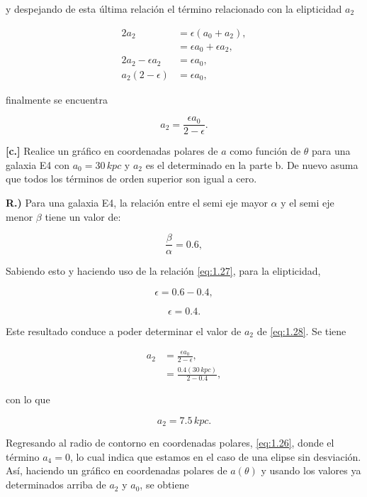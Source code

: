 \documentclass[paper=a4, fontsize=10pt]{scrartcl} %
\begin{document}
y despejando de esta última relación el término relacionado con la elipticidad $a_2$

\begin{align*}
2 a_2 & = \epsilon(a_0 + a_2), \\
& = \epsilon a_0 + \epsilon a_2, \\
2a_2 - \epsilon a_2 & =  \epsilon a_0, \\
a_2 (2 - \epsilon) & = \epsilon a_0, 
\end{align*}

finalmente se encuentra 

\begin{equation} \label{eq:1.28}
a_2 = \frac{\epsilon a_0}{2- \epsilon}.
\end{equation}


{\bf{[c.]}} Realice un gráfico en coordenadas polares de $a$ como función de $\theta$ para una galaxia E4 con $a_0 = 30 \, kpc$ y $a_2$ es el determinado en la parte b. De nuevo asuma que todos los términos de
orden superior son igual a cero. 

\vspace{0.3cm} 

{\bf{R.)}} Para una galaxia E4, la relación entre el semi eje mayor $\alpha$ y el semi eje menor $\beta$ tiene un valor de: 

$$ \frac{\beta}{\alpha} = 0.6, $$

Sabiendo esto y haciendo uso de la relación \eqref{eq:1.27}, para la elipticidad, 

$$ \epsilon = 0.6 - 0.4,$$

\begin{equation} \label{eq:1.29} 
\epsilon = 0.4. 
\end{equation}

Este resultado conduce a poder determinar el valor de $a_2$ de \eqref{eq:1.28}. Se tiene 

\begin{align*}
a_2 & = \frac{\epsilon a_0}{2- \epsilon}, \\
& = \frac{0.4 ( 30 \, kpc)}{2-0.4}, 
\end{align*}

con lo que 

\begin{equation} \label{eq:1.30} 
a_2 = 7.5 \, kpc.
\end{equation}

Regresando al radio de contorno en coordenadas polares, \eqref{eq:1.26}, donde el término $a_4 =0$, lo cual indica que estamos en el caso de una elipse sin desviación. Así, haciendo un gráfico en coordenadas polares de $a(\theta)$  y usando los valores ya determinados arriba de $a_2$ y $a_0$, se obtiene
\end{document}
